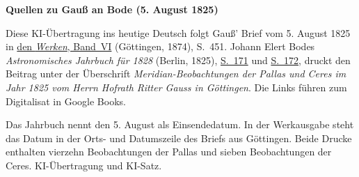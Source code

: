 \clearpage\thispagestyle{empty}
\begin{center}\textbf{Quellen zu Gauß an Bode (5. August 1825)}\end{center}
\noindent Diese KI-Übertragung ins heutige Deutsch folgt Gauß’ Brief vom 5. August 1825 in \href{https://gdz.sub.uni-goettingen.de/id/PPN236007467}{den \textit{Werken}, Band~VI} (Göttingen, 1874), S.~451. Johann Elert Bodes \textit{Astronomisches Jahrbuch für 1828} (Berlin, 1825), \href{https://books.google.nl/books?id=GDAPAAAAQAAJ&pg=PA171&redir_esc=y}{S.~171} und \href{https://books.google.nl/books?id=GDAPAAAAQAAJ&pg=PA172&redir_esc=y}{S.~172}, druckt den Beitrag unter der Überschrift \textit{Meridian-Beobachtungen der Pallas und Ceres im Jahr 1825 vom Herrn Hofrath Ritter Gauss in Göttingen}. Die Links führen zum Digitalisat in Google Books.
\par\smallskip\noindent Das Jahrbuch nennt den 5. August als Einsendedatum. In der Werkausgabe steht das Datum in der Orts- und Datumszeile des Briefs aus Göttingen. Beide Drucke enthalten vierzehn Beobachtungen der Pallas und sieben Beobachtungen der Ceres. KI-Übertragung und KI-Satz.
\clearpage

